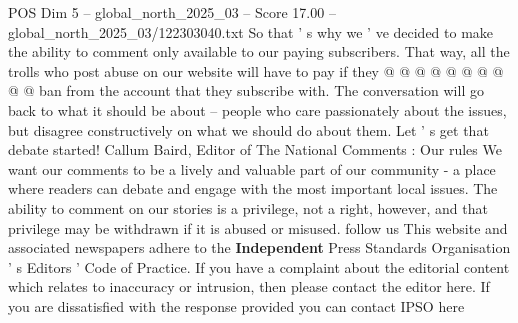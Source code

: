 \begin{textsample}{POS Dim 5 – global\_north\_2025\_03 – Score 17.00 – global\_north\_2025\_03/122303040.txt}
So that ' s why we ' ve decided to make the ability to comment only available to our paying subscribers.
That way, all the trolls who post abuse on our website will have to pay if they @ @ @ @ @ @ @ @ @ @ ban from the account that they subscribe with.
The conversation will go back to what it should be about -- people who care passionately about the issues, but disagree constructively on what we should do about them.
Let ' s get that debate started!
Callum Baird, Editor of The National Comments : Our rules We want our comments to be a lively and valuable part of our community - a place where readers can debate and engage with the most important local issues.
The ability to comment on our stories is a privilege, not a right, however, and that privilege may be withdrawn if it is abused or misused. follow us This website and associated newspapers adhere to the \textbf{Independent} Press Standards Organisation ' s Editors ' Code of Practice.
If you have a complaint about the editorial content which relates to inaccuracy or intrusion, then please contact the editor here.
If you are dissatisfied with the response provided you can contact IPSO here

\end{textsample}
